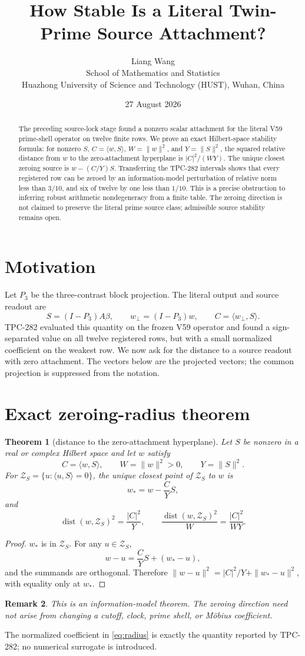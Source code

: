 \documentclass[11pt]{article}
\title{How Stable Is a Literal Twin-Prime Source Attachment?}
\author{Liang Wang\\School of Mathematics and Statistics\\
Huazhong University of Science and Technology (HUST), Wuhan, China}
\date{27 August 2026}
\newtheorem{theorem}{Theorem}
\newtheorem{remark}[theorem]{Remark}
\begin{document}
\maketitle
\begin{abstract}
The preceding source-lock stage found a nonzero scalar attachment for the
literal V59 prime-shell operator on twelve finite rows.  We prove an exact
Hilbert-space stability formula: for nonzero $S$, $C=\langle w,S\rangle$,
$W=\|w\|^2$, and $Y=\|S\|^2$, the squared relative distance from $w$ to the
zero-attachment hyperplane is $|C|^2/(WY)$.  The unique closest zeroing source
is $w-(C/Y)S$.  Transferring the TPC-282 intervals shows that every registered
row can be zeroed by an information-model perturbation of relative norm less
than $3/10$, and six of twelve by one less than $1/10$.  This is a precise
obstruction to inferring robust arithmetic nondegeneracy from a finite table.
The zeroing direction is not claimed to preserve the literal prime source
class; admissible source stability remains open.
\end{abstract}
\section{Motivation}
Let $P_3$ be the three-contrast block projection.  The literal output and
source readout are
\[
 S=(I-P_3)A\beta,\qquad w_\perp=(I-P_3)w,\qquad
 C=\langle w_\perp,S\rangle .
\]
TPC-282 evaluated this quantity on the frozen V59 operator and found a
sign-separated value on all twelve registered rows, but with a small
normalized coefficient on the weakest row.  We now ask for the distance to a
source readout with zero attachment.  The vectors below are the projected
vectors; the common projection is suppressed from the notation.
\section{Exact zeroing-radius theorem}
\begin{theorem}[distance to the zero-attachment hyperplane]
Let $S$ be nonzero in a real or complex Hilbert space and let $w$ satisfy
\[
 C=\langle w,S\rangle,\qquad W=\|w\|^2>0,\qquad Y=\|S\|^2.
\]
For $\mathcal Z_S=\{u:\langle u,S\rangle=0\}$, the unique closest point of
$\mathcal Z_S$ to $w$ is
\[
 w_*=w-\frac{C}{Y}S,
\]
and
\[
 \operatorname{dist}(w,\mathcal Z_S)^2=\frac{|C|^2}{Y},
 \qquad
 \frac{\operatorname{dist}(w,\mathcal Z_S)^2}{W}
 =\frac{|C|^2}{WY}.
 \label{eq:radius}
\]
\end{theorem}
\begin{proof}
$w_*$ is in $\mathcal Z_S$.  For any $u\in\mathcal Z_S$,
\[
 w-u=\frac{C}{Y}S+(w_*-u),
\]
and the summands are orthogonal.  Therefore
$\|w-u\|^2=|C|^2/Y+\|w_*-u\|^2$, with equality only at $w_*$.
\end{proof}
\begin{remark}
This is an information-model theorem.  The zeroing direction need not arise
from changing a cutoff, clock, prime shell, or Möbius coefficient.
\end{remark}
The normalized coefficient in \eqref{eq:radius} is exactly the quantity
reported by TPC-282; no numerical surrogate is introduced.
\end{document}
